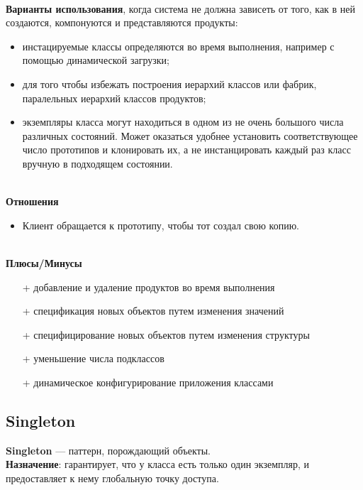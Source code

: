 \documentclass[a3paper,11pt]{report}
\begin{document}
\large\textbf{\\Варианты использования}, когда система не должна зависеть от того, как в ней создаются, компонуются и представляются продукты:
\begin{itemize}
\item инстацируемые классы определяются во время выполнения, например с помощью динамической загрузки;
\item для того чтобы избежать построения иерархий классов или фабрик, паралельных иерархий классов продуктов;
\item экземпляры класса могут находиться в одном из не очень большого числа различных состояний. Может оказаться удобнее установить соответствующее число прототипов и клонировать их, а не инстанцировать каждый раз класс вручную в подходящем состоянии.
\end{itemize}

\textbf{\\Отношения}
\begin{itemize}
\item Клиент обращается к прототипу, чтобы тот создал свою копию.
\end{itemize}

\textbf{\\Плюсы/Минусы}
\begin{itemize}
\item [+] добавление и удаление продуктов во время выполнения
\item [+] спецификация новых объектов путем изменения значений
\item [+] специфицирование новых объектов путем изменения структуры
\item [+] уменьшение числа подклассов
\item [+] динамическое конфигурирование приложения классами
\end{itemize}

\newpage
\subsection{Singleton}

\large\textbf{Singleton} --- паттерн, порождающий объекты.
\\
\large\textbf{Назначение}: гарантирует, что у класса есть только один экземпляр, и предоставляет к нему
глобальную точку доступа.
\\
\end{document}
